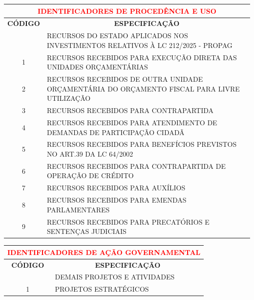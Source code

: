 \documentclass{article}
\begin{document}
\noindent\begin{longtable}[c]{m{1cm}|m{14cm}}
\multicolumn{2}{c}{\cellcolor{gray!50} \textcolor{red} {\normalsize \textbf{ IDENTIFICADORES DE PROCEDÊNCIA E USO}}}\Tstrut  \\[2ex]
\hline\hline
\multicolumn{1}{c|}{\textbf{CÓDIGO}} & \multicolumn{1}{c}{\textbf{ESPECIFICAÇÃO}} \\
\hline
\endfirsthead
\hline
\endhead
\endfoot
\hline\hline\hline
\endlastfoot
\multicolumn{1}{c|}{ 0 } & RECURSOS DO ESTADO APLICADOS NOS INVESTIMENTOS RELATIVOS À LC 212/2025 - PROPAG \\
\multicolumn{1}{c|}{ 1 } & RECURSOS RECEBIDOS PARA EXECUÇÃO DIRETA DAS UNIDADES ORÇAMENTÁRIAS \\
\multicolumn{1}{c|}{ 2 } & RECURSOS RECEBIDOS DE OUTRA UNIDADE ORÇAMENTÁRIA DO ORÇAMENTO FISCAL PARA LIVRE UTILIZAÇÃO \\
\multicolumn{1}{c|}{ 3 } & RECURSOS RECEBIDOS PARA CONTRAPARTIDA \\
\multicolumn{1}{c|}{ 4 } & RECURSOS RECEBIDOS PARA ATENDIMENTO DE DEMANDAS DE PARTICIPAÇÃO CIDADÃ \\
\multicolumn{1}{c|}{ 5 } & RECURSOS RECEBIDOS PARA BENEFÍCIOS PREVISTOS NO ART.39 DA LC 64/2002 \\
\multicolumn{1}{c|}{ 6 } & RECURSOS RECEBIDOS PARA CONTRAPARTIDA DE OPERAÇÃO DE CRÉDITO \\
\multicolumn{1}{c|}{ 7 } & RECURSOS RECEBIDOS PARA AUXÍLIOS \\
\multicolumn{1}{c|}{ 8 } & RECURSOS RECEBIDOS PARA EMENDAS PARLAMENTARES \\
\multicolumn{1}{c|}{ 9 } & RECURSOS RECEBIDOS PARA PRECATÓRIOS E SENTENÇAS JUDICIAIS \\
\end{longtable}
\newpage
\noindent\begin{longtable}[c]{m{1cm}|m{11cm}}
\multicolumn{2}{c}{\cellcolor{gray!50} \textcolor{red} {\normalsize \textbf{ IDENTIFICADORES DE AÇÃO GOVERNAMENTAL}}}\Tstrut  \\[2ex]
\hline\hline
\multicolumn{1}{c|}{\textbf{CÓDIGO}} & \multicolumn{1}{c}{\textbf{ESPECIFICAÇÃO}} \\
\hline
\endfirsthead
\hline
\endhead
\endfoot
\hline\hline\hline
\endlastfoot
\multicolumn{1}{c|}{ 0 } & DEMAIS PROJETOS E ATIVIDADES \\
\multicolumn{1}{c|}{ 1 } & PROJETOS ESTRATÉGICOS \\
\end{longtable}
% 
\end{document}
